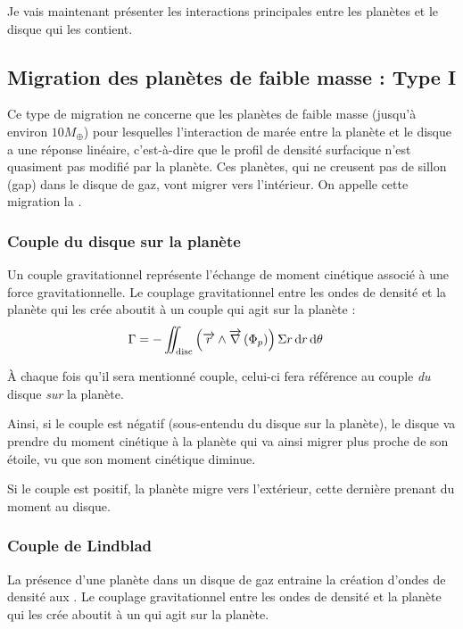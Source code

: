 Je vais maintenant présenter les interactions principales entre les planètes et le disque qui les contient. 

\subsection{Migration des planètes de faible masse : Type I}\label{sec:type_I}
Ce type de migration ne concerne que les planètes de faible masse (jusqu'à environ $10M_{\oplus}$) pour lesquelles l'interaction de marée entre la planète et le disque a une réponse linéaire, c'est-à-dire que le profil de densité surfacique n'est quasiment pas modifié par la planète. Ces planètes, qui ne creusent pas de sillon (gap) dans le disque de gaz, vont migrer vers l'intérieur. On appelle cette migration la .


\subsubsection{Couple du disque sur la planète}
Un couple gravitationnel représente l'échange de moment cinétique associé à une force gravitationnelle.  Le couplage gravitationnel entre
les ondes de densité et la planète qui les crée aboutit à un couple qui agit sur la planète : 
\begin{align}
\Gamma &= - \iint_\text{disc} \left({\overrightarrow{r}}\wedge{\overrightarrow{\nabla}} \left( \Phi_p\right)\right)\Sigma r \operatorname{d \!} r \operatorname{d \!} \theta
\end{align}

À chaque fois qu'il sera mentionné \og couple\fg, celui-ci fera référence au couple \emph{du} disque \emph{sur} la planète.

Ainsi, si le couple est négatif (sous-entendu du disque sur la planète), le disque va prendre du moment cinétique à la planète qui va ainsi migrer plus proche de son étoile, vu que son moment cinétique diminue.

Si le couple est positif, la planète migre vers l'extérieur, cette dernière prenant du moment au disque.

\subsubsection{Couple de Lindblad}
La présence d'une planète dans un disque de gaz entraine la création d'ondes de densité aux  \citep{goldreich1979excitation}. Le couplage gravitationnel entre les ondes de densité et la
planète qui les crée aboutit à un  qui agit sur la planète.

